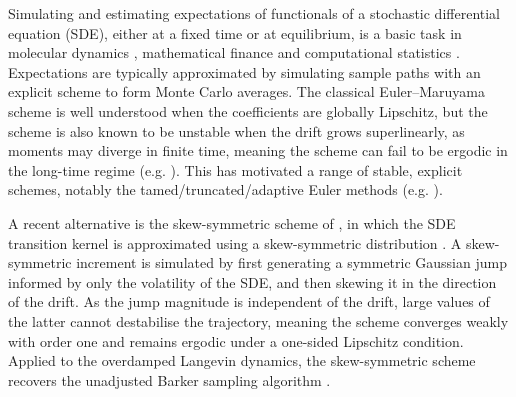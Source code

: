 \documentclass[11pt]{article}
\begin{document}
Simulating and estimating expectations of functionals of a stochastic differential equation (SDE), either at a fixed time or at equilibrium, is a basic task in molecular dynamics \cite{krauth2006statistical}, mathematical finance \cite{karatzas2014brownian} and computational statistics \cite{Roberts.Tweedie:96}. Expectations are typically approximated by simulating sample paths with an explicit scheme to form Monte Carlo averages. The classical Euler--Maruyama scheme is well understood when the coefficients are globally Lipschitz, but the scheme is also known to be unstable when the drift grows superlinearly, as moments may diverge in finite time, meaning the scheme can fail to be ergodic in the long-time regime (e.g. \cite{Hutzenthaler.Jentzen.Kloeden:2011, Roberts.Tweedie:96}). This has motivated a range of stable, explicit schemes, notably the tamed/truncated/adaptive Euler methods (e.g. \cite{Fang:20, hutzenthaler.jentzen.lloeden:12, mao:15, sabanis:13}).

A recent alternative is the skew-symmetric scheme of \cite{skew:ima}, in which the SDE transition kernel is approximated using a skew-symmetric distribution \cite{azzalini2013skew}. A skew-symmetric increment is simulated by first generating a symmetric Gaussian jump informed by only the volatility of the SDE, and then skewing it in the direction of the drift.  As the jump magnitude is independent of the drift, large values of the latter cannot destabilise the trajectory, meaning the scheme converges weakly with order one and remains ergodic under a one-sided Lipschitz condition. Applied to the overdamped Langevin dynamics, the skew-symmetric scheme recovers the unadjusted Barker sampling algorithm \cite{livingstone.zanella:22,skew:ima}.
\end{document}
